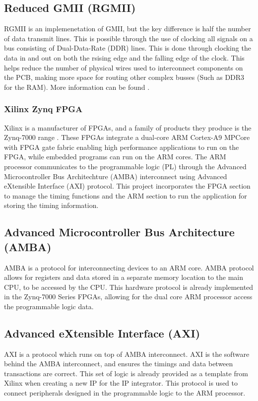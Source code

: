 \subsection{Reduced GMII (RGMII)}

\par RGMII is an implemenetation of GMII, but the key difference is half the number of data transmit lines. This is
possible through the use of clocking all signals on a bus consisting of Dual-Data-Rate (DDR) lines. This is done 
through clocking the data in and out on both the rsising edge and the falling edge of the clock. This helps reduce 
the number of physical wires used to interconnect components on the PCB, making more space for routing other complex 
busses (Such as DDR3 for the RAM). More information can be found \cite{RGMIISpec}.

\subsubsection{Xilinx Zynq FPGA}

\par Xilinx is a manufacturer of FPGAs, and a family of products they produce is the Zynq-7000 range \cite{fpga}.
These FPGAs integrate a dual-core ARM Cortex-A9 MPCore with FPGA gate fabric enabling high performance 
applications to run on the FPGA, while embedded programs can run on the ARM cores. The ARM processor communicates
to the programmable logic (PL) through the Advanced Microcontroller Bus Architechture (AMBA) interconnect
using Advanced eXtensible Interface (AXI) protocol.
This project incorporates the FPGA section to manage the timing functions and the ARM section to run the 
application for storing the timing information.

\subsection{Advanced Microcontroller Bus Architecture (AMBA)}

AMBA is a protocol for interconnecting devices to an ARM core. AMBA protocol allows for registers
and data stored in a separate memory location to the main CPU, to be accessed by the CPU. This
hardware protocol is already implemented in the Zynq-7000 Series FPGAs, allowing for the dual core
ARM processor access the programmable logic data.

\subsection{Advanced eXtensible Interface (AXI)}

AXI is a protocol which runs on top of AMBA interconnect. AXI is the software behind the AMBA interconnect, and
ensures the timings and data between transactions are correct. This set of logic is already provided
as a template from Xilinx when creating a new IP for the IP integrator. This protocol is used to
connect peripherals designed in the programmable logic to the ARM processor.
